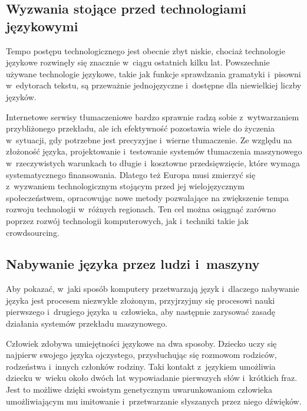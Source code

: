 \begin{multicols}{2}
\subsection{Wyzwania stojące przed technologiami językowymi} 

Tempo postępu technologicznego jest obecnie zbyt niskie, chociaż
technologie językowe rozwinęły się znacznie w~ciągu ostatnich
kilku lat. Powszechnie używane technologie językowe, takie jak
funkcje sprawdzania gramatyki i~pisowni w~edytorach tekstu, są
przeważnie jednojęzyczne i~dostępne dla niewielkiej liczby
języków. 


Internetowe serwisy tłumaczeniowe bardzo sprawnie radzą sobie
z~wytwarzaniem przybliżonego przekładu, ale ich efektywność
pozostawia wiele do życzenia w~sytuacji, gdy potrzebne jest
precyzyjne i~wierne tłumaczenie. Ze względu na złożoność
języka, projektowanie i~testowanie systemów tłumaczenia maszynowego
w~rzeczywistych warunkach to długie i~kosztowne przedsięwzięcie,
które wymaga systematycznego finansowania. Dlatego też Europa musi
zmierzyć się z~wyzwaniem technologicznym stojącym przed jej
wielojęzycznym społeczeństwem, opracowując nowe metody
pozwalające na zwiększenie tempa rozwoju technologii w~różnych
regionach. Ten cel można osiągnąć zarówno poprzez rozwój
technologii komputerowych, jak i~techniki takie jak crowdsourcing. 

\subsection{Nabywanie języka przez ludzi i~maszyny} Aby pokazać,
w~jaki sposób komputery przetwarzają język i~dlaczego nabywanie
języka jest procesem niezwykle złożonym, przyjrzyjmy się procesowi
nauki pierwszego i~drugiego języka u~człowieka, aby następnie
zarysować zasadę działania systemów przekładu maszynowego. 

Człowiek zdobywa umiejętności językowe na dwa sposoby. Dziecko
uczy się najpierw swojego języka ojczystego, przysłuchując się
rozmowom rodziców, rodzeństwa i~innych członków rodziny. Taki
kontakt z~językiem umożliwia dziecku w~wieku około dwóch lat
wypowiadanie pierwszych słów i~krótkich fraz. Jest to możliwe
dzięki swoistym genetycznym uwarunkowaniom człowieka
umożliwiającym mu imitowanie i~przetwarzanie słyszanych przez niego
dźwięków. 



\end{multicols}
